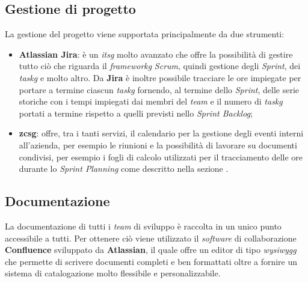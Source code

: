 \newpage

\subsection{Gestione di progetto}
    La gestione del progetto viene supportata principalmente da due strumenti:
    \begin{itemize}
        \item \textbf{Atlassian Jira}: è un \textit{\gls{itsg}} molto avanzato che offre la possibilità di gestire tutto ciò che riguarda il \textit{\gls{frameworkg}} \textit{Scrum}, quindi gestione degli \textit{Sprint}, dei \textit{\gls{taskg}} e molto altro. Da \textbf{Jira} è inoltre possibile tracciare le ore impiegate per portare a termine ciascun \textit{\gls{taskg}} fornendo, al termine dello \textit{Sprint}, delle serie storiche con i tempi impiegati dai membri del \textit{team} e il numero di \textit{\gls{taskg}} portati a termine rispetto a quelli previsti nello \textit{Sprint Backlog}; 
        \item \textbf{\gls{zcsg}}: offre, tra i tanti servizi, il calendario per la gestione degli eventi interni all'azienda, per esempio le riunioni e la possibilità di lavorare su documenti condivisi, per esempio i fogli di calcolo utilizzati per il tracciamento delle ore durante lo \textit{Sprint Planning} come descritto nella sezione . 
    \end{itemize}

\subsection{Documentazione}\label{sec:doc}
    La documentazione di tutti i \textit{team} di sviluppo è raccolta in un unico punto accessibile a tutti. Per ottenere ciò viene utilizzato il \textit{software} di collaborazione \textbf{Confluence} sviluppato da \textbf{Atlassian}, il quale offre un editor di tipo \textit{\gls{wysiwygg}} che permette di scrivere documenti completi e ben formattati oltre a fornire un sistema di catalogazione molto flessibile e personalizzabile.

\newpage

